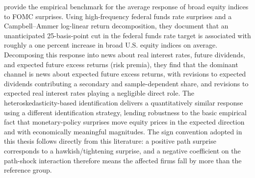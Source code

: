  provide the empirical benchmark for the
average response of broad equity indices to FOMC surprises. Using
high-frequency federal funds rate surprises and a Campbell--Ammer
log-linear return decomposition, they document that an unanticipated
25-basis-point cut in the federal funds rate target is associated
with roughly a one percent increase in broad U.S. equity indices on
average. Decomposing this response into news about real interest
rates, future dividends, and expected future excess returns
(risk premia), they find that the dominant channel is news about
expected future excess returns, with revisions to expected dividends
contributing a secondary and sample-dependent share, and revisions
to expected real interest rates playing a negligible direct role.
The \citet{rigobonSack2004} heteroskedasticity-based identification
delivers a quantitatively similar response using a different
identification strategy, lending robustness to the basic empirical
fact that monetary-policy surprises move equity prices in the
expected direction and with economically meaningful magnitudes. The
sign convention adopted in this thesis follows directly from this
literature: a positive path surprise corresponds to a hawkish/tightening
surprise, and a negative coefficient on the path-shock interaction
therefore means the affected firms fall by more than the reference
group.

